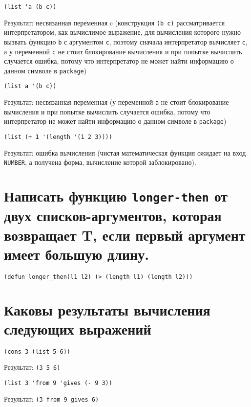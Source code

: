 \begin{lstlisting}
(list 'a (b c))
\end{lstlisting}
Результат: несвязанная переменная c (конструкция \texttt{(b c)} рассматривается интерпретатором, как вычислимое выражение, для вычисления которого нужно вызвать функцию \texttt{b} с аргументом \texttt{c}, поэтому сначала интерпретатор вычисляет \texttt{c}, а у переменной \texttt{c} не стоит блокирование вычисления и при попытке вычислить случается ошибка, потому что интерпретатор не может найти информацию о данном символе в \texttt{package})
\vspace{20mm}

\begin{lstlisting}
(list a '(b c))
\end{lstlisting}
Результат: несвязанная переменная (у переменной \texttt{a} не стоит блокирование вычисления и при попытке вычислить случается ошибка, потому что интерпретатор не может найти информацию о данном символе в \texttt{package})
\vspace{20mm}

\begin{lstlisting}
(list (+ 1 '(length '(1 2 3))))
\end{lstlisting}
Результат: ошибка вычисления (чистая математическая функция ожидает на вход \texttt{NUMBER}, а получена форма, вычисление которой заблокировано).
\vspace{20mm}

\section{Написать функцию \texttt{longer-then} от двух списков-аргументов, которая возвращает T, если первый аргумент имеет большую длину.}

\begin{lstlisting}
(defun longer_then(l1 l2) (> (length l1) (length l2)))
\end{lstlisting}

\section{Каковы результаты вычисления следующих выражений}

\begin{lstlisting}
(cons 3 (list 5 6))
\end{lstlisting}
Результат: \texttt{(3 5 6)}
\vspace{20mm}

\begin{lstlisting}
(list 3 'from 9 'gives (- 9 3))
\end{lstlisting}
Результат: \texttt{(3 from 9 gives 6)}
\vspace{20mm}

